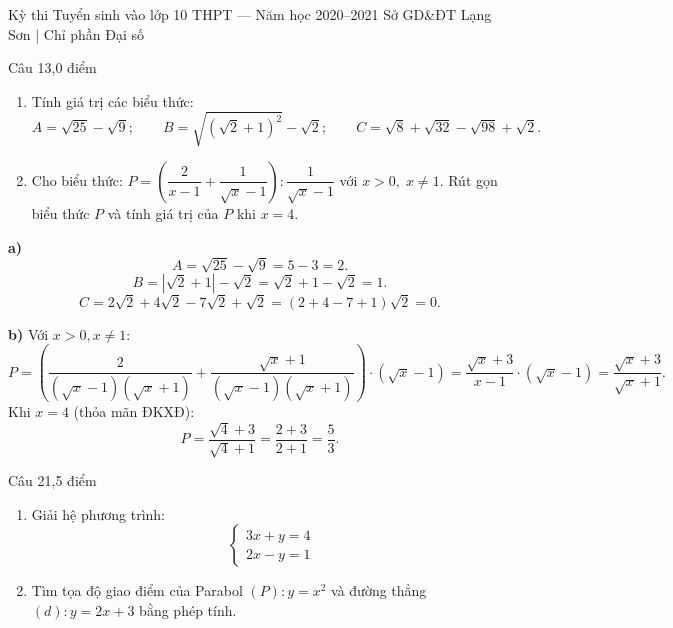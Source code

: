 ﻿%
%
  {Kỳ thi Tuyển sinh vào lớp 10 THPT — Năm học 2020--2021}%
  {Sở GD\&ĐT Lạng Sơn | Chỉ phần Đại số}

\begin{de_cau}{Câu 1}{3,0 điểm}
\begin{enumerate}[label=\alph*)]
\item Tính giá trị các biểu thức:
\[A = \sqrt{25} - \sqrt{9};\qquad B = \sqrt{(\sqrt{2}+1)^2} - \sqrt{2};\qquad C = \sqrt{8} + \sqrt{32} - \sqrt{98} + \sqrt{2}.\]
\item Cho biểu thức: $P = \left(\dfrac{2}{x-1} + \dfrac{1}{\sqrt{x}-1}\right) : \dfrac{1}{\sqrt{x}-1}$ với $x > 0,\; x \neq 1$.
Rút gọn biểu thức $P$ và tính giá trị của $P$ khi $x = 4$.
\end{enumerate}
\end{de_cau}

\begin{loi_giai_cau}
\textbf{a)}
\[A = \sqrt{25} - \sqrt{9} = 5 - 3 = \boxed{2}.\]
\[B = |\sqrt{2}+1| - \sqrt{2} = \sqrt{2}+1-\sqrt{2} = \boxed{1}.\]
\[C = 2\sqrt{2} + 4\sqrt{2} - 7\sqrt{2} + \sqrt{2} = (2+4-7+1)\sqrt{2} = \boxed{0}.\]

\textbf{b)} Với $x > 0, x \neq 1$:
\[P = \left(\frac{2}{(\sqrt{x}-1)(\sqrt{x}+1)} + \frac{\sqrt{x}+1}{(\sqrt{x}-1)(\sqrt{x}+1)}\right) \cdot (\sqrt{x}-1) = \frac{\sqrt{x}+3}{x-1} \cdot (\sqrt{x}-1) = \boxed{\frac{\sqrt{x}+3}{\sqrt{x}+1}}.\]
Khi $x = 4$ (thỏa mãn ĐKXĐ):
\[P = \frac{\sqrt{4}+3}{\sqrt{4}+1} = \frac{2+3}{2+1} = \boxed{\frac{5}{3}}.\]
\end{loi_giai_cau}

\begin{de_cau}{Câu 2}{1,5 điểm}
\begin{enumerate}[label=\alph*)]
\item Giải hệ phương trình: 
\[ \begin{cases} 3x + y = 4 \\ 2x - y = 1 \end{cases} \]
\item Tìm tọa độ giao điểm của Parabol $(P)\colon y = x^2$ và đường thẳng $(d)\colon y = 2x + 3$ bằng phép tính.
\end{enumerate}
\end{de_cau}

